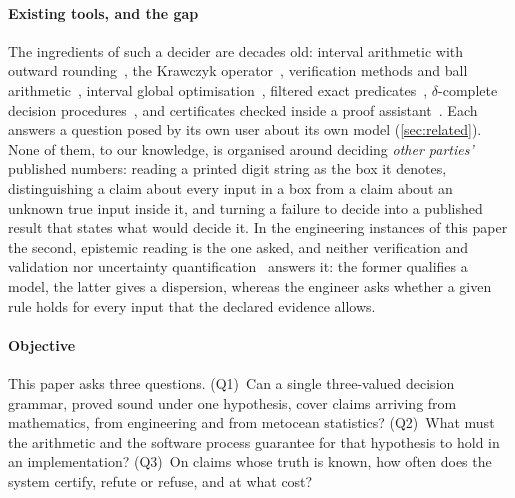 \documentclass[preprint,11pt,a4paper]{elsarticle}
\theoremstyle{definition}
\begin{document}
\paragraph{Existing tools, and the gap}
The ingredients of such a decider are decades old: interval arithmetic with outward rounding~\citep{Moore79,Neumaier90,IEEE1788std}, the Krawczyk operator~\citep{Krawczyk69,Rump10}, verification methods and ball arithmetic~\citep{Rump99,Johansson17}, interval global optimisation~\citep{HansenWalster04,Kearfott96}, filtered exact predicates~\citep{Fortune96,Shewchuk97,Yap97}, $\delta$-complete decision procedures~\citep{GaoAvigadClarke12,dReal13}, and certificates checked inside a proof assistant~\citep{SolovyevHales13,MartinDorel16,Mahboubi19}. Each answers a question posed by its own user about its own model (\cref{sec:related}). None of them, to our knowledge, is organised around deciding \emph{other parties'} published numbers: reading a printed digit string as the box it denotes, distinguishing a claim about every input in a box from a claim about an unknown true input inside it, and turning a failure to decide into a published result that states what would decide it. In the engineering instances of this paper the second, epistemic reading is the one asked, and neither verification and validation nor uncertainty quantification~\citep{OberkampfRoy10} answers it: the former qualifies a model, the latter gives a dispersion, whereas the engineer asks whether a given rule holds for every input that the declared evidence allows.

\paragraph{Objective}
This paper asks three questions. (Q1)~Can a single three-valued decision grammar, proved sound under one hypothesis, cover claims arriving from mathematics, from engineering and from metocean statistics? (Q2)~What must the arithmetic and the software process guarantee for that hypothesis to hold in an implementation? (Q3)~On claims whose truth is known, how often does the system certify, refute or refuse, and at what cost?
\end{document}
